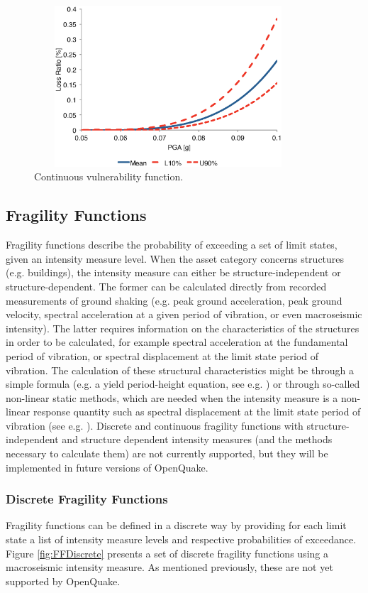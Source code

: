 \begin{figure}[ht]
\centering
\includegraphics[width=10cm,height=6cm]{./Figures/Part_Risk/VFContinuous}
\caption{Continuous vulnerability function.}
\label{fig:VFContinuous}
\end{figure}

\subsection{Fragility Functions}
Fragility functions describe the probability of exceeding a set of limit states, given an intensity measure level. When the asset category concerns structures (e.g. buildings), the intensity measure can either be structure-independent or structure-dependent. The former can be calculated directly from recorded measurements of ground shaking (e.g. peak ground acceleration, peak ground velocity, spectral acceleration at a given period of vibration, or even macroseismic intensity). The latter requires information on the characteristics of the structures in order to be calculated, for example spectral acceleration at the fundamental period of vibration, or spectral displacement at the limit state period of vibration. The calculation of these structural characteristics might be through a simple formula (e.g. a yield period-height equation, see e.g. \citet{CrowleyPinho2004} ) or through so-called non-linear static methods, which are needed when the intensity measure is a non-linear response quantity such as spectral displacement at the limit state period of vibration (see e.g. \citet{FEMA440ATC2005}).
Discrete and continuous fragility functions with structure-independent and structure dependent intensity measures (and the methods necessary to calculate them) are not currently supported, but they will be implemented in future versions of OpenQuake. 

\subsubsection{Discrete Fragility Functions}
Fragility functions can be defined in a discrete way by providing for each limit state a list of intensity measure levels and respective probabilities of exceedance. Figure \ref{fig:FFDiscrete} presents a set of discrete fragility functions using a macroseismic intensity measure. As mentioned previously, these are not yet supported by OpenQuake.

